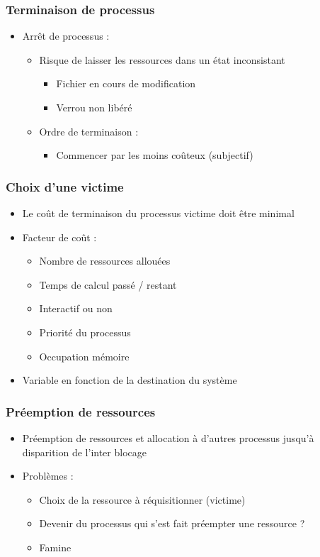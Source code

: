 \begin{frame}
\frametitle{Terminaison de processus}
\begin{itemize}
\item Arrêt de processus :
\begin{itemize}
\item Risque de laisser les ressources dans un état inconsistant
\begin{itemize}
\item Fichier en cours de modification
\item Verrou non libéré
\end{itemize}
\item Ordre de terminaison :
\begin{itemize}
\item Commencer par les moins coûteux (subjectif)
\end{itemize}
\end{itemize}
\end{itemize}
\end{frame}

\begin{frame}
\frametitle{Choix d’une victime}
\begin{itemize}
\item <1->Le coût de terminaison du processus victime doit être minimal
\item <2->Facteur de coût :
\begin{itemize}
\item Nombre de ressources allouées
\item Temps de calcul passé / restant
\item Interactif ou non
\item Priorité du processus
\item Occupation mémoire
\end{itemize}
\item <3->Variable en fonction de la destination du système
\end{itemize}
\end{frame}

\begin{frame}
\frametitle{Préemption de ressources}
\begin{itemize}
\item <1->Préemption de ressources et allocation à d’autres processus jusqu’à disparition de l’inter blocage
\item <2->Problèmes :
\begin{itemize}
\item Choix de la ressource à réquisitionner (victime)
\item Devenir du processus qui s’est fait préempter une ressource ?
\item Famine
\end{itemize}
\end{itemize}
\end{frame}

